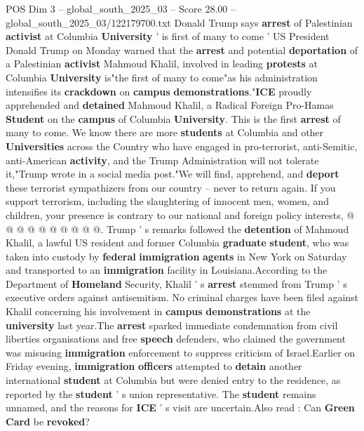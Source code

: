 \begin{textsample}{POS Dim 3 – global\_south\_2025\_03 – Score 28.00 – global\_south\_2025\_03/122179700.txt}  \label{ex:f3_pos_039}
Donald Trump says \textbf{arrest} of Palestinian \textbf{activist} at Columbia \textbf{University} ' is first of many to come ' US President Donald Trump on Monday warned that the \textbf{arrest} and potential \textbf{deportation} of a Palestinian \textbf{activist} Mahmoud Khalil, involved in leading \textbf{protests} at Columbia \textbf{University} is"the first of many to come"as his administration intensifies its \textbf{crackdown} on \textbf{campus} \textbf{demonstrations}."\textbf{ICE} proudly apprehended and \textbf{detained} Mahmoud Khalil, a Radical Foreign Pro-Hamas \textbf{Student} on the \textbf{campus} of Columbia \textbf{University}.
This is the first \textbf{arrest} of many to come.
We know there are more \textbf{students} at Columbia and other \textbf{Universities} across the Country who have engaged in pro-terrorist, anti-Semitic, anti-American \textbf{activity}, and the Trump Administration will not tolerate it,"Trump wrote in a social media post."We will find, apprehend, and \textbf{deport} these terrorist sympathizers from our country -- never to return again.
If you support terrorism, including the slaughtering of innocent men, women, and children, your presence is contrary to our national and foreign policy interests, @ @ @ @ @ @ @ @ @ @.
Trump ' s remarks followed the \textbf{detention} of Mahmoud Khalil, a lawful US resident and former Columbia \textbf{graduate} \textbf{student}, who was taken into custody by \textbf{federal} \textbf{immigration} \textbf{agents} in New York on Saturday and transported to an \textbf{immigration} facility in Louisiana.According to the Department of \textbf{Homeland} Security, Khalil ' s \textbf{arrest} stemmed from Trump ' s executive orders against antisemitism.
No criminal charges have been filed against Khalil concerning his involvement in \textbf{campus} \textbf{demonstrations} at the \textbf{university} last year.The \textbf{arrest} sparked immediate condemnation from civil liberties organisations and free \textbf{speech} defenders, who claimed the government was misusing \textbf{immigration} enforcement to suppress criticism of Israel.Earlier on Friday evening, \textbf{immigration} \textbf{officers} attempted to \textbf{detain} another international \textbf{student} at Columbia but were denied entry to the residence, as reported by the \textbf{student} ' s union representative.
The \textbf{student} remains unnamed, and the reasons for \textbf{ICE} ' s visit are uncertain.Also read : Can \textbf{Green} \textbf{Card} be \textbf{revoked}?

\end{textsample}
